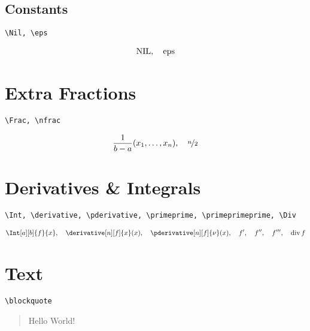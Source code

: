 \documentclass{article}
\begin{document}
\subsection{Constants}

\verb|\Nil, \eps|

\begin{align*}
    \NIL,
    \quad
    \eps
\end{align*}


\section{Extra Fractions}

\verb|\Frac, \nfrac|

\begin{align*}
    \Frac{x_1, \dots, x_n}{b - a},
    \quad
    \nfrac{n}{2}
\end{align*}


\section{Derivatives \& Integrals}

\verb|\Int, \derivative, \pderivative, \primeprime, \primeprimeprime, \Div|

\begin{align*}
    \Int[a][b]{f}{x},
    \quad
    \derivative[n][f]{x}(x),
    \quad
    \pderivative[n][f]{\nu}(x),
    \quad
    f^\prime,
    \quad
    f^\primeprime,
    \quad
    f^\primeprimeprime,
    \quad
    \Div f
\end{align*}


\section{Text}

\verb|\blockquote|

\begin{center}
    \blockquote{Hello World!}
\end{center}


\printbibliography
\end{document}

